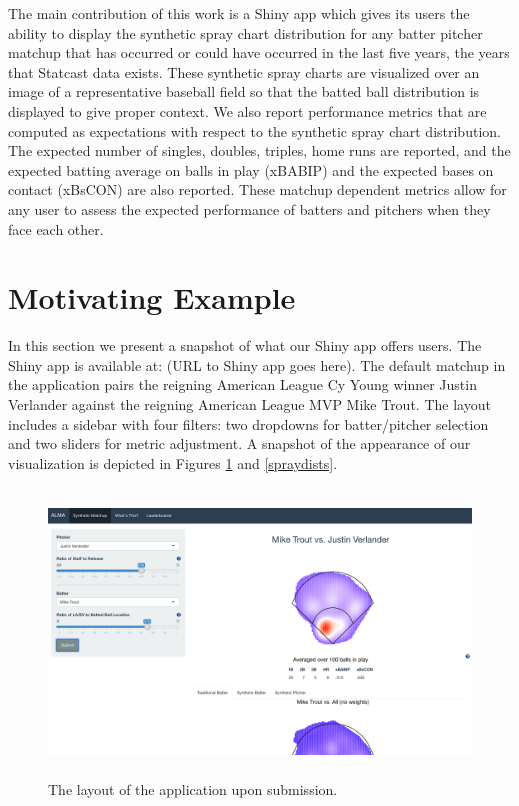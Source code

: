 \documentclass[11pt]{article}
\begin{document}
The main contribution of this work is a Shiny app which gives its users the ability to display the synthetic spray chart distribution for any batter pitcher matchup that has occurred or could have occurred in the last five years, the years that Statcast data exists. These synthetic spray charts are visualized over an image of a representative baseball field so that the batted ball distribution is displayed to give proper context. We also report performance metrics that are computed as expectations with respect to the synthetic spray chart distribution. The expected number of singles, doubles, triples, home runs are reported, and the expected batting average on balls in play (xBABIP) and the expected bases on contact (xBsCON) are also reported. These matchup dependent metrics allow for any user to assess the expected performance of batters and pitchers when they face each other. 



\section{Motivating Example}

In this section we present a snapshot of what our Shiny app offers users. The Shiny app is available at: (URL to Shiny app goes here). The default matchup in the application pairs the reigning American League Cy Young winner Justin Verlander against the reigning American League MVP Mike Trout. The layout includes a sidebar with four filters: two dropdowns for batter/pitcher selection and two sliders for metric adjustment. A snapshot of the appearance of our visualization is depicted in Figures \ref{layout} and \ref{spraydists}.


\begin{figure}
\centering
    \includegraphics[width=5.5in, height=3in]{layout.png}
    \caption{The layout of the application upon submission.}
    \label{layout}
\end{figure}
\end{document}
